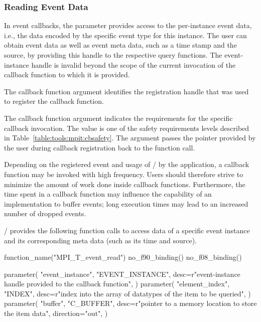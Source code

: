 \subsubsection{Reading Event Data}

In event callbacks, the parameter  provides
access to the per-instance event data, i.e., the data encoded by the
specific event type for this instance.  The user can obtain event data as
well as event meta data, such as a time stamp and the source, by providing
this handle to the respective query functions. The event-instance handle is
invalid beyond the scope of the current invocation of the callback function
to which it is provided.

The callback function argument  
identifies the registration handle that was used to register the callback function.

The callback function  argument  indicates the requirements for the
specific callback invocation. The value is one of the safety requirements levels
described in Table~\ref{table:tools:mpit:cbsafety}.
The argument  passes the pointer provided by the
user during callback registration back to the function call.

\begin{users}
Depending on the registered event and usage of \MPI/ by the application, a
callback function may be invoked with high frequency. Users should
therefore strive to minimize the amount of work done inside callback
functions. Furthermore, the time spent in a callback function may influence
the capability of an implementation to buffer events; long execution
times may lead to an increased number of dropped events.
\end{users}

\MPI/ provides the following function calls to access data of a specific event
instance and its corresponding meta data (such as its time and source).

\begin{mpi-binding}
    function_name("MPI_T_event_read")
    no_f90_binding()
    no_f08_binding()

    parameter(
        "event_instance",
        "EVENT_INSTANCE",
        desc=r"event-instance handle provided to the callback function",
    )
    parameter(
        "element_index",
        "INDEX",
        desc=r"index into the array of datatypes of the item to be queried",
    )
    parameter(
        "buffer",
        "C_BUFFER",
        desc=r"pointer to a memory location to store the item data",
        direction="out",
    )
\end{mpi-binding}

